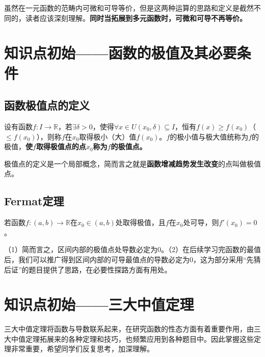 \begin{remark}
	虽然在一元函数的范畴内可微和可导等价，但是这两种运算的思路和定义是截然不同的，读者应该深刻理解。\textbf{同时当拓展到多元函数时，可微和可导不再等价。}
\end{remark}

\section{知识点初始——函数的极值及其必要条件}\label{sec:4.2}

\subsection{函数极值点的定义}\label{sec:4.2.1}

\begin{definition}
	设有函数$f:I\to\mathbb{R}$，若$\exists\delta>0$，使得$\forall x\in U(x_0,\delta)\subseteq I$，恒有$f(x)\geq f(x_0)$（$\leq f(x_0)$），则称$f$在$x_0$取得极小（大）值$f(x_0)$。$f$的极小值与极大值统称为$f$的极值，\textbf{使$f$取得极值点的点$x_0$称为$f$的极值点。}
\end{definition}

\begin{remark}
	极值点的定义是一个局部概念，简而言之就是\textbf{函数增减趋势发生改变}的点叫做极值点。
\end{remark}

\subsection{Fermat定理}\label{sec:4.2.2}

\begin{theorem}
	若函数$f:(a,b)\to\mathbb{R}$在$x_0\in (a,b)$处取得极值，且$f$在$x_0$处可导，则$f'(x_0)=0$。
\end{theorem}

\begin{remark}
	（1）简而言之，区间内部的极值点处导数必定为0。（2）在后续学习完函数的最值后，我们可以推广得到区间内部的可导最值点的导数必定为0，这为部分采用“先猜后证”的题目提供了思路，在必要性探路方面有用处。
\end{remark}

\section{知识点初始——三大中值定理}\label{sec:4.3}
三大中值定理将函数与导数联系起来，在研究函数的性态方面有着重要作用，由三大中值定理拓展来的各种定理和技巧，也频繁应用到各种题目中。因此掌握这些定理非常重要，希望同学们反复思考，加深理解。

